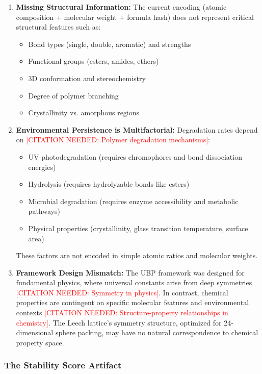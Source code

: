 \documentclass[11pt,letterpaper]{article}
\begin{document}
\begin{enumerate}
    \item \textbf{Missing Structural Information:} The current encoding (atomic composition + molecular weight + formula hash) does not represent critical structural features such as:
    \begin{itemize}
        \item Bond types (single, double, aromatic) and strengths
        \item Functional groups (esters, amides, ethers)
        \item 3D conformation and stereochemistry
        \item Degree of polymer branching
        \item Crystallinity vs. amorphous regions
    \end{itemize}

    \item \textbf{Environmental Persistence is Multifactorial:} Degradation rates depend on \textcolor{red}{[CITATION NEEDED: Polymer degradation mechanisms]}:
    \begin{itemize}
        \item UV photodegradation (requires chromophores and bond dissociation energies)
        \item Hydrolysis (requires hydrolyzable bonds like esters)
        \item Microbial degradation (requires enzyme accessibility and metabolic pathways)
        \item Physical properties (crystallinity, glass transition temperature, surface area)
    \end{itemize}
    These factors are not encoded in simple atomic ratios and molecular weights.

    \item \textbf{Framework Design Mismatch:} The UBP framework was designed for fundamental physics, where universal constants arise from deep symmetries \textcolor{red}{[CITATION NEEDED: Symmetry in physics]}. In contrast, chemical properties are contingent on specific molecular features and environmental contexts \textcolor{red}{[CITATION NEEDED: Structure-property relationships in chemistry]}. The Leech lattice's symmetry structure, optimized for 24-dimensional sphere packing, may have no natural correspondence to chemical property space.
\end{enumerate}

\subsubsection{The Stability Score Artifact}
\end{document}
